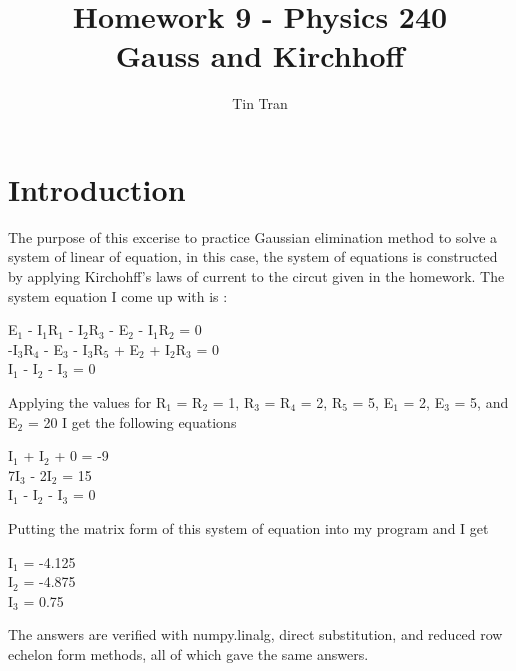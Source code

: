 \documentclass{article}
\begin{document}
\title{Homework 9 - Physics 240\\
		Gauss and Kirchhoff}
\author{Tin Tran}

\maketitle

\section{Introduction}
The purpose of this excerise to practice Gaussian elimination method to solve a system of linear of equation, in this case, the system of equations is constructed by applying Kirchohff's laws of current to the circut given in the homework. The system equation I come up with is :
\begin{center}
E$_1$ - I$_1$R$_1$ - I$_2$R$_3$ - E$_2$ - I$_1$R$_2$ = 0\\
-I$_3$R$_4$ - E$_3$ - I$_3$R$_5$ + E$_2$ + I$_2$R$_3$ = 0\\
I$_1$ - I$_2$ - I$_3$ = 0
\end{center}
Applying the values for R$_1$ = R$_2$ = 1, R$_3$ = R$_4$ = 2, R$_5$ = 5, E$_1$ = 2, E$_3$ = 5, and E$_2$ = 20 I get the following equations
\begin{center}
I$_1$ + I$_2$ + 0 = -9\\
7I$_3$ - 2I$_2$ = 15\\
I$_1$ - I$_2$ - I$_3$ = 0
\end{center}
Putting the matrix form of this system of equation into my program and I get
\begin{center}
I$_1$ = -4.125\\
I$_2$ = -4.875\\
I$_3$ = 0.75\\
\end{center}
The answers are verified with numpy.linalg, direct substitution, and reduced row echelon form methods, all of which gave the same answers.
\end{document}
